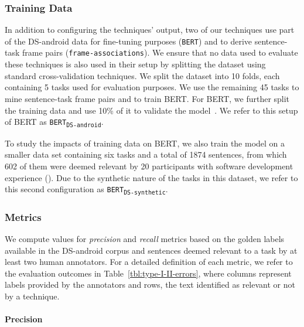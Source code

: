 \subsubsection{Training Data}


In addition to configuring the techniques' output, two of our techniques use part of the  \acs{DS-android} data for fine-tuning purposes (\texttt{BERT}) and to derive sentence-task frame pairs (\texttt{frame-associations}).
We ensure that no data used to evaluate these techniques is also used in their setup by 
splitting the dataset using standard cross-validation techniques.
We split the dataset into 10 folds, each containing 5 tasks used for evaluation purposes. 
We use the remaining 45 tasks to mine sentence-task frame pairs and to train BERT. 
For BERT, we further split the training data and use 10\% of it to validate the model~\cite{Chaparro2017, fucci2019, Petrosyan2015}.
We refer to this setup of BERT as \texttt{BERT\textsubscript{DS-android}}.


To study the impacts of training data on BERT, we also train the model on a smaller data set containing six tasks and a total of 1874 sentences, from which 602 of them were deemed relevant by 20 participants with software development experience (). Due to the synthetic nature of the tasks in this dataset, we refer to this 
second configuration as \texttt{BERT\textsubscript{DS-synthetic}}.




\subsubsection{Metrics}


We compute values for \textit{precision} and \textit{recall} metrics based on the golden labels available in the \acs{DS-android} corpus and sentences deemed relevant to a task by at least two human annotators.
For a detailed definition of each metric, we refer to the evaluation outcomes in Table~\ref{tbl:type-I-II-errors}, where  columns represent  labels provided by the annotators and rows,
the text identified as relevant or not by a technique.

% 

\medskip




\paragraph{\textbf{Precision}}

